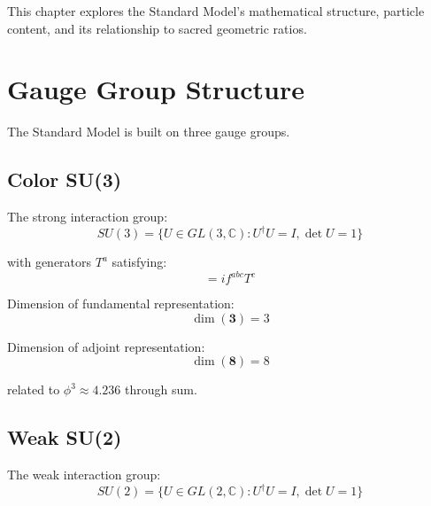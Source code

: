 This chapter explores the Standard Model's mathematical structure, particle content, and its relationship to sacred geometric ratios.

\section{Gauge Group Structure}

The Standard Model is built on three gauge groups.

\subsection{Color SU(3)}

\begin{definition}
\label{fa_20:def:su3}
The strong interaction group:
\begin{equation}
SU(3) = \{U \in GL(3,\mathbb{C}) : U^\dagger U = I, \det U = 1\}
\end{equation}

with generators $T^a$ satisfying:
\begin{equation}
[T^a, T^b] = i f^{abc} T^c
\end{equation}
\end{definition}

\begin{proposition}[SU(3) Dimension]
\label{fa_20:prop:su3-dim}
Dimension of fundamental representation:
\begin{equation}
\dim(\mathbf{3}) = 3
\end{equation}

Dimension of adjoint representation:
\begin{equation}
\dim(\mathbf{8}) = 8
\end{equation}

related to $\phi^3 \approx 4.236$ through sum.
\end{proposition}

\subsection{Weak SU(2)}

\begin{definition}
\label{fa_20:def:su2}
The weak interaction group:
\begin{equation}
SU(2) = \{U \in GL(2,\mathbb{C}) : U^\dagger U = I, \det U = 1\}
\end{equation}
\end{definition}

